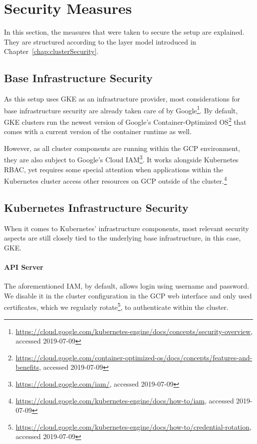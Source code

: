 \section{Security Measures}

In this section, the measures that were taken to secure the setup are explained. They are structured according to the layer model introduced in Chapter~\ref{chap:clusterSecurity}.

\subsection{Base Infrastructure Security}

As this setup uses \ac{GKE} as an infrastructure provider, most considerations for base infrastructure security are already taken care of by Google\footnote{\url{https://cloud.google.com/kubernetes-engine/docs/concepts/security-overview}, accessed 2019-07-09}. By default, \ac{GKE} clusters run the newest version of Google's Container-Optimized OS\footnote{\url{https://cloud.google.com/container-optimized-os/docs/concepts/features-and-benefits}, accessed 2019-07-09} that comes with a current version of the container runtime as well. 

However, as all cluster components are running within the \ac{GCP} environment, they are also subject to Google's Cloud \ac{IAM}\footnote{\url{https://cloud.google.com/iam/}, accessed 2019-07-09}. It works alongside Kubernetes \ac{RBAC}, yet requires some special attention when applications within the Kubernetes cluster access other resources on \ac{GCP} outside of the cluster.\footnote{\url{https://cloud.google.com/kubernetes-engine/docs/how-to/iam}, accessed 2019-07-09}

\subsection{Kubernetes Infrastructure Security}

When it comes to Kubernetes' infrastructure components, most relevant security aspects are still closely tied to the underlying base infrastructure, in this case, \ac{GKE}.

\paragraph{API Server}

The aforementioned \ac{IAM}, by default, allows login using username and password. We disable it in the cluster configuration in the \ac{GCP} web interface and only used certificates, which we regularly rotate\footnote{\url{https://cloud.google.com/kubernetes-engine/docs/how-to/credential-rotation}, accessed 2019-07-09}, to authenticate within the cluster.

